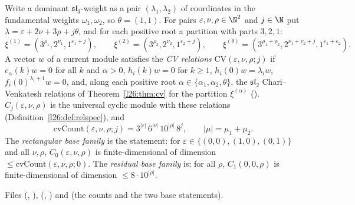 \begin{definition}\label{l26:def:cvfamily}
Write a dominant $\mathfrak{sl}_3$-weight as a pair $(\lambda_1,\lambda_2)$ of coordinates in the fundamental weights
$\omega_1,\omega_2$, so $\theta=(1,1)$. For pairs $\varepsilon,\nu,\rho\in\N^2$ and $j\in\N$ put
$\lambda=\varepsilon+2\nu+3\rho+j\theta$, and for each positive root a partition with parts $3,2,1$:
\begin{equation*}
\xi^{(1)}=(3^{\rho_1},2^{\nu_1},1^{\varepsilon_1+j}),\qquad \xi^{(2)}=(3^{\rho_2},2^{\nu_2},1^{\varepsilon_2+j}),\qquad
\xi^{(\theta)}=(3^{\rho_1+\rho_2},2^{\nu_1+\nu_2+j},1^{\varepsilon_1+\varepsilon_2}) .
\end{equation*}
A vector $w$ of a current module satisfies the \emph{CV relations} $\mathrm{CV}(\varepsilon,\nu,\rho;j)$ if $e_\alpha(k)w=0$ for all
$k$ and $\alpha>0$, $h_i(k)w=0$ for $k\ge1$, $h_i(0)w=\lambda_iw$, $f_i(0)^{\lambda_i+1}w=0$, and, along each positive root
$\alpha\in\{\alpha_1,\alpha_2,\theta\}$, the $\mathfrak{sl}_2$ Chari--Venkatesh relations of Theorem~\ref{l26:thm:cv} for the
partition $\xi^{(\alpha)}$ (). $C_j(\varepsilon,\nu,\rho)$ is the universal cyclic module with these relations
(Definition~\ref{l26:def:relspec}), and
\begin{equation*}
\mathrm{cvCount}(\varepsilon,\nu,\rho;j)=3^{|\varepsilon|}\,6^{|\nu|}\,10^{|\rho|}\,8^{j},\qquad |\mu|=\mu_1+\mu_2 .
\end{equation*}
The \emph{rectangular base family} is the statement: for $\varepsilon\in\{(0,0),(1,0),(0,1)\}$ and all $\nu,\rho$,
$C_0(\varepsilon,\nu,\rho)$ is finite-dimensional of dimension $\le\mathrm{cvCount}(\varepsilon,\nu,\rho;0)$. The \emph{residual
base family} is: for all $\rho$, $C_1(0,0,\rho)$ is finite-dimensional of dimension $\le8\cdot10^{|\rho|}$.
\end{definition}
\noindent Files  (, ),
 (, ) and
 (the counts and the two base statements).
